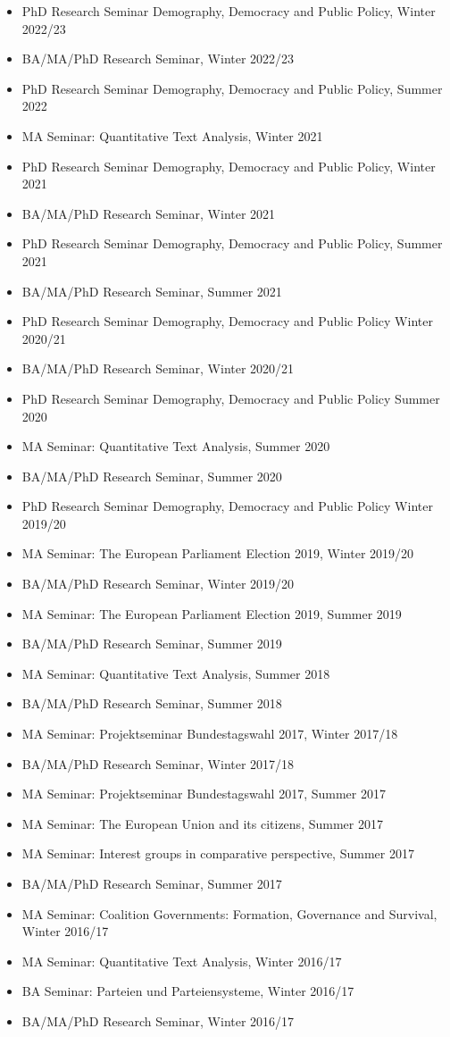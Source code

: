 \begin{itemize}[topsep=0pt, noitemsep, leftmargin=3]
	\item PhD Research Seminar Demography, Democracy and Public Policy, Winter 2022/23
	\item BA/MA/PhD Research Seminar, Winter 2022/23
	\item PhD Research Seminar Demography, Democracy and Public Policy, Summer 2022
	\item MA Seminar: Quantitative Text Analysis, Winter 2021
	\item PhD Research Seminar Demography, Democracy and Public Policy, Winter 2021
	\item BA/MA/PhD Research Seminar, Winter 2021
	\item PhD Research Seminar Demography, Democracy and Public Policy, Summer 2021
	\item BA/MA/PhD Research Seminar, Summer 2021
	\item PhD Research Seminar Demography, Democracy and Public Policy Winter 2020/21
	\item BA/MA/PhD Research Seminar, Winter 2020/21
	\item PhD Research Seminar Demography, Democracy and Public Policy  Summer 2020
	\item MA Seminar: Quantitative Text Analysis, Summer 2020
	\item BA/MA/PhD Research Seminar, Summer 2020
	\item PhD Research Seminar Demography, Democracy and Public Policy  Winter 2019/20
	\item MA Seminar: The European Parliament Election 2019, Winter 2019/20
	\item BA/MA/PhD Research Seminar, Winter 2019/20
	\item MA Seminar: The European Parliament Election 2019, Summer 2019
	\item BA/MA/PhD Research Seminar, Summer 2019
	\item MA Seminar: Quantitative Text Analysis, Summer 2018
	\item BA/MA/PhD Research Seminar, Summer 2018 
	\item MA Seminar: Projektseminar Bundestagswahl 2017, Winter 2017/18
	\item BA/MA/PhD Research Seminar, Winter 2017/18
	\item MA Seminar: Projektseminar Bundestagswahl 2017, Summer 2017
	\item MA Seminar: The European Union and its citizens, Summer 2017
	\item MA Seminar: Interest groups in comparative perspective, Summer 2017
	\item BA/MA/PhD Research Seminar, Summer 2017
	\item MA Seminar: Coalition Governments: Formation, Governance and Survival, Winter 2016/17
	\item MA Seminar: Quantitative Text Analysis, Winter 2016/17
	\item BA Seminar: Parteien und Parteiensysteme, Winter 2016/17
	\item BA/MA/PhD Research Seminar, Winter 2016/17
\end{itemize}

